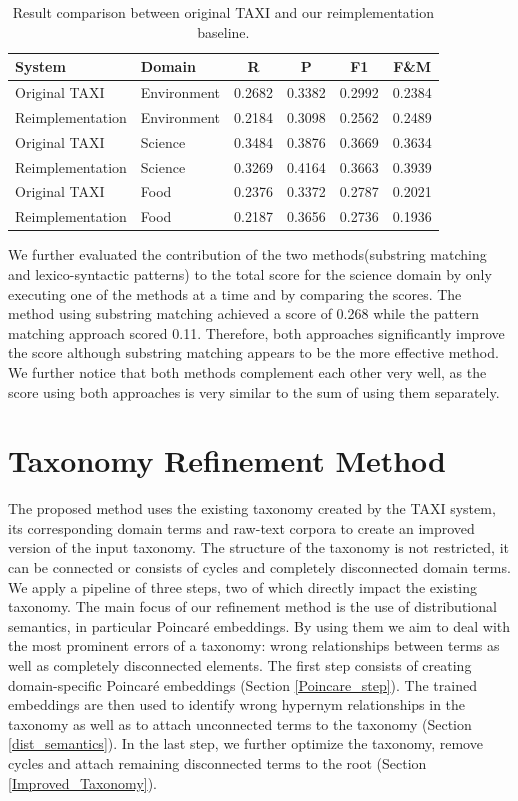 \documentclass[12pt, headsepline, a4paper]{scrartcl}
\begin{document}
\begin{table}
	\begin{tabular}{l | l | c | c | c | c }
		\textbf{System}
		& \textbf{Domain}
		& \textbf{R}
		& \textbf{P}
		& \textbf{F1}
		& \textbf{F\&{}M} \\
		\toprule
		Original TAXI   
		& Environment
		& 0.2682	
		& 0.3382
		& 0.2992	
		& 0.2384
		\\
		Reimplementation   
		& Environment
		& 0.2184	
		& 0.3098
		& 0.2562
		& 0.2489
		\\
		\hline
		Original TAXI   
		& Science
		& 0.3484
		& 0.3876
		& 0.3669
		& 0.3634\\
		Reimplementation    
		& Science
		& 0.3269
		& 0.4164
		& 0.3663
		& 0.3939
		\\\hline
		Original TAXI   
		& Food
		& 0.2376
		& 0.3372
		& 0.2787
		& 0.2021
		\\
		Reimplementation 
		& Food
		& 0.2187
		& 0.3656
		& 0.2736
		& 0.1936
		\\\bottomrule
	\end{tabular}
	\caption{Result comparison between original TAXI and our reimplementation baseline.}
	\label{baseline}
\end{table}

We further evaluated the contribution of the two methods(substring matching and lexico-syntactic patterns) to the total score for the science domain by only executing one of the methods at a time and by comparing the scores. The method using substring matching achieved a score of 0.268 while the pattern matching approach scored 0.11. Therefore, both approaches significantly improve the score although substring matching appears to be the more effective method. We further notice that both methods complement each other very well, as the score using both approaches is very similar to the sum of using them separately.


\section{Taxonomy Refinement Method}
The proposed method uses the existing taxonomy created by the TAXI system, its corresponding domain terms and raw-text corpora to create an improved version of the input taxonomy. The structure of the taxonomy is not restricted, it can be connected or consists of cycles and completely disconnected domain terms. We apply a pipeline of three steps, two of which directly impact the existing taxonomy. The main focus of our refinement method is the use of distributional semantics, in particular Poincaré embeddings. By using them we aim to deal with the most prominent errors of a taxonomy: wrong relationships between terms as well as completely disconnected elements.
The first step consists of creating domain-specific Poincaré embeddings (Section \ref{Poincare_step}). The trained embeddings are then used to identify wrong hypernym relationships in the taxonomy  as well as to attach unconnected terms to the taxonomy (Section \ref{dist_semantics}). In the last step, we further optimize the taxonomy, remove cycles and attach remaining disconnected terms to the root (Section \ref{Improved_Taxonomy}).
\end{document}
